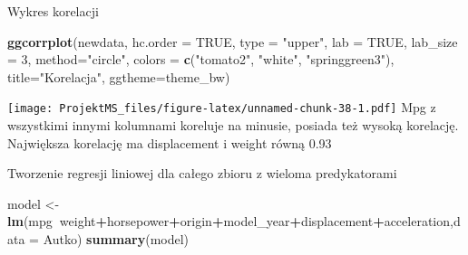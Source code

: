 \documentclass[
]{article}
\newenvironment{Shaded}{\begin{snugshade}}{\end{snugshade}}
\newcommand{\DataTypeTok}[1]{\textcolor[rgb]{0.13,0.29,0.53}{#1}}
\newcommand{\DecValTok}[1]{\textcolor[rgb]{0.00,0.00,0.81}{#1}}
\newcommand{\KeywordTok}[1]{\textcolor[rgb]{0.13,0.29,0.53}{\textbf{#1}}}
\newcommand{\NormalTok}[1]{#1}
\newcommand{\OperatorTok}[1]{\textcolor[rgb]{0.81,0.36,0.00}{\textbf{#1}}}
\newcommand{\OtherTok}[1]{\textcolor[rgb]{0.56,0.35,0.01}{#1}}
\newcommand{\StringTok}[1]{\textcolor[rgb]{0.31,0.60,0.02}{#1}}
\begin{document}
Wykres korelacji

\begin{Shaded}
\begin{Highlighting}[]
\KeywordTok{ggcorrplot}\NormalTok{(newdata, }\DataTypeTok{hc.order =} \OtherTok{TRUE}\NormalTok{, }
           \DataTypeTok{type =} \StringTok{"upper"}\NormalTok{, }
           \DataTypeTok{lab =} \OtherTok{TRUE}\NormalTok{, }
           \DataTypeTok{lab_size =} \DecValTok{3}\NormalTok{, }
           \DataTypeTok{method=}\StringTok{"circle"}\NormalTok{, }
           \DataTypeTok{colors =} \KeywordTok{c}\NormalTok{(}\StringTok{"tomato2"}\NormalTok{, }\StringTok{"white"}\NormalTok{, }\StringTok{"springgreen3"}\NormalTok{), }
           \DataTypeTok{title=}\StringTok{"Korelacja"}\NormalTok{, }
           \DataTypeTok{ggtheme=}\NormalTok{theme_bw)}
\end{Highlighting}
\end{Shaded}

\texttt{[image: ProjektMS\_files/figure-latex/unnamed-chunk-38-1.pdf]}
Mpg z wszystkimi innymi kolumnami koreluje na minusie, posiada też
wysoką korelację. Największa korelację ma displacement i weight równą
0.93

Tworzenie regresji liniowej dla całego zbioru z wieloma predykatorami

\begin{Shaded}
\begin{Highlighting}[]
\NormalTok{model <-}\StringTok{ }\KeywordTok{lm}\NormalTok{(mpg}\OperatorTok{~}\NormalTok{weight}\OperatorTok{+}\NormalTok{horsepower}\OperatorTok{+}\NormalTok{origin}\OperatorTok{+}\NormalTok{model_year}\OperatorTok{+}\NormalTok{displacement}\OperatorTok{+}\NormalTok{acceleration,}\DataTypeTok{data =}\NormalTok{ Autko)}
\KeywordTok{summary}\NormalTok{(model)}
\end{Highlighting}
\end{Shaded}
\end{document}
